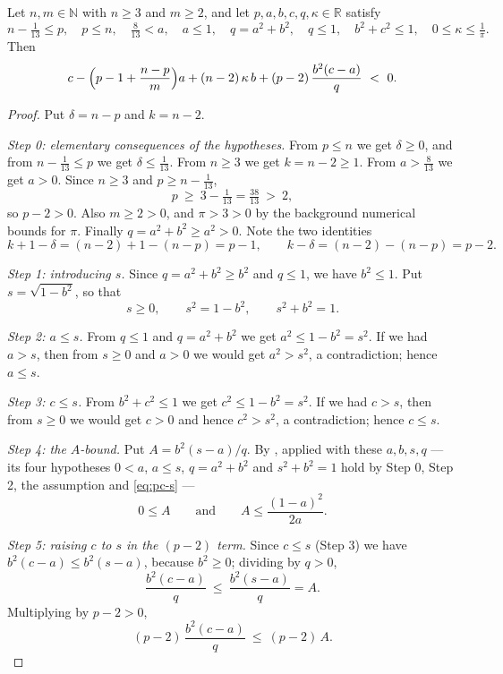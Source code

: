 \begin{lemma}
Let $n,m\in\mathbb{N}$ with $n\ge3$ and $m\ge2$, and let
$p,a,b,c,q,\kappa\in\mathbb{R}$ satisfy
\[
  n-\tfrac1{13}\le p,\quad p\le n,\quad
  \tfrac8{13}<a,\quad a\le1,\quad
  q=a^2+b^2,\quad q\le1,\quad b^2+c^2\le1,\quad
  0\le\kappa\le\tfrac1\pi .
\]
Then
\[
  c-\Bigl(p-1+\frac{n-p}{m}\Bigr)a+(n-2)\,\kappa\,b
   +(p-2)\,\frac{b^2(c-a)}{q}\ <\ 0 .
\]
\end{lemma}
\begin{proof}
Put $\delta=n-p$ and $k=n-2$.

\emph{Step 0: elementary consequences of the hypotheses.} From $p\le n$ we get
$\delta\ge0$, and from $n-\tfrac1{13}\le p$ we get $\delta\le\tfrac1{13}$. From
$n\ge3$ we get $k=n-2\ge1$. From $a>\tfrac8{13}$ we get $a>0$. Since
$n\ge3$ and $p\ge n-\tfrac1{13}$,
\[
  p\ \ge\ 3-\tfrac1{13}=\tfrac{38}{13}\ >\ 2,
\]
so $p-2>0$. Also $m\ge2>0$, and $\pi>3>0$ by the background numerical bounds for
$\pi$. Finally $q=a^2+b^2\ge a^2>0$. Note the two identities
\begin{equation}\label{eq:pc-kid}
  k+1-\delta=(n-2)+1-(n-p)=p-1,
  \qquad
  k-\delta=(n-2)-(n-p)=p-2 .
\end{equation}

\emph{Step 1: introducing $s$.} Since $q=a^2+b^2\ge b^2$ and $q\le1$, we have
$b^2\le1$. Put $s=\sqrt{1-b^2}$, so that
\begin{equation}\label{eq:pc-s}
  s\ge0,\qquad s^2=1-b^2,\qquad s^2+b^2=1 .
\end{equation}

\emph{Step 2: $a\le s$.} From $q\le1$ and $q=a^2+b^2$ we get
$a^2\le1-b^2=s^2$. If we had $a>s$, then from $s\ge0$ and $a>0$ we would get
$a^2>s^2$, a contradiction; hence $a\le s$.

\emph{Step 3: $c\le s$.} From $b^2+c^2\le1$ we get $c^2\le1-b^2=s^2$. If we had
$c>s$, then from $s\ge0$ we would get $c>0$ and hence $c^2>s^2$, a
contradiction; hence $c\le s$.

\emph{Step 4: the $A$-bound.} Put $A=b^2(s-a)/q$. By , applied
with these $a,b,s,q$ --- its four hypotheses $0<a$, $a\le s$, $q=a^2+b^2$ and
$s^2+b^2=1$ hold by Step 0, Step 2, the assumption and \eqref{eq:pc-s} ---
\begin{equation}\label{eq:pc-A}
  0\le A
  \qquad\text{and}\qquad
  A\le\frac{(1-a)^2}{2a}.
\end{equation}

\emph{Step 5: raising $c$ to $s$ in the $(p-2)$ term.} Since $c\le s$ (Step 3)
we have $b^2(c-a)\le b^2(s-a)$, because $b^2\ge0$; dividing by $q>0$,
\[
  \frac{b^2(c-a)}{q}\ \le\ \frac{b^2(s-a)}{q}=A .
\]
Multiplying by $p-2>0$,
\begin{equation}\label{eq:pc-step5}
  (p-2)\,\frac{b^2(c-a)}{q}\ \le\ (p-2)\,A .
\end{equation}


\end{proof}
